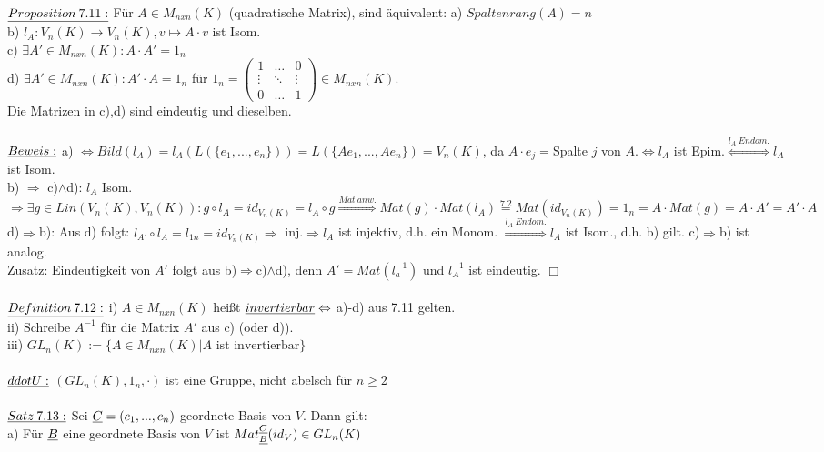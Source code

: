 \documentclass[fleqn, a4paper, 11pt]{scrartcl}
\theoremstyle{definition}
\begin{document}
$\uline{Proposition\:7.11:}$ Für $A\in M_{nxn}(K)$ (quadratische Matrix), sind äquivalent: a) $Spaltenrang(A)=n$ \\
b) $l_A:V_n(K)\rightarrow V_n(K),v\mapsto A\cdot v$ ist Isom.\\
c) $\exists A'\in M_{nxn}(K):A\cdot A'=1_n$\\
d) $\exists A'\in M_{nxn}(K):A'\cdot A=1_n$ für $1_n=\begin{pmatrix}
	1 & \dots & 0\\
	\vdots & \ddots & \vdots\\
	0 & \dots & 1
\end{pmatrix}\in M_{nxn}(K)$.\\
Die Matrizen in c),d) sind eindeutig und dieselben.\\
\\
$\uline{Beweis:}$ a) $\Leftrightarrow Bild(l_A)=l_A(L(\{e_1,...,e_n\}))=L(\{Ae_1,...,Ae_n\})=V_n(K)$, da $A\cdot e_j=$Spalte $j$ von $A$.$\Leftrightarrow l_A$ ist Epim.$\stackrel{l_A\:Endom.}{\Leftrightarrow}l_A$ ist Isom.\\
b) $\Rightarrow$ c)$\wedge$d): $l_A$ Isom. $\Rightarrow\exists g\in Lin(V_n(K),V_n(K)):g\circ l_A=id_{V_n(K)}=l_A\circ g\stackrel{Mat\:anw.}{\Rightarrow}Mat(g)\cdot Mat(l_A)\stackrel{7.2}{=}Mat(id_{V_n(K)})=1_n=A\cdot Mat(g)=A\cdot A'=A'\cdot A$\\
d)$\Rightarrow$b): Aus d) folgt: $l_{A'}\circ l_A=l_{1n}=id_{V_n(K)}\Rightarrow$ inj.$\Rightarrow l_A$ ist injektiv, d.h. ein Monom. $\stackrel{l_A\:Endom.}{\Rightarrow}l_A$ ist Isom., d.h. b) gilt. c)$\Rightarrow$b) ist analog.\\
Zusatz: Eindeutigkeit von $A'$ folgt aus b)$\Rightarrow$c)$\wedge$d), denn $A'=Mat(l_a^{-1})$ und $l_A^{-1}$ ist eindeutig. \hfill $\Box$\\
\\
$\uline{Definition\:7.12:}$ i) $A\in M_{nxn}(K)$ heißt $\uline{invertierbar}\Leftrightarrow$ a)-d) aus 7.11 gelten.\\
ii) Schreibe $A^{-1}$ für die Matrix $A'$ aus c) (oder d)).\\
iii) $GL_n(K):=\{A\in M_{nxn}(K)|A\text{ ist invertierbar}\}$\\
\\
$\uline{ddot{U}:}$ $(GL_n(K),1_n,\cdot)$ ist eine Gruppe, nicht abelsch für $n\geq 2$\\
\\
$\uline{Satz\:7.13:}$ Sei $\uline{C}=(c_1,...,c_n)$ geordnete Basis von $V$. Dann gilt:\\
a) Für $\uline{B}$ eine geordnete Basis von $V$ ist $Mat_{\uline{B}}^{\uline{C}}(id_V)\in GL_n(K)$\\
\end{document}
